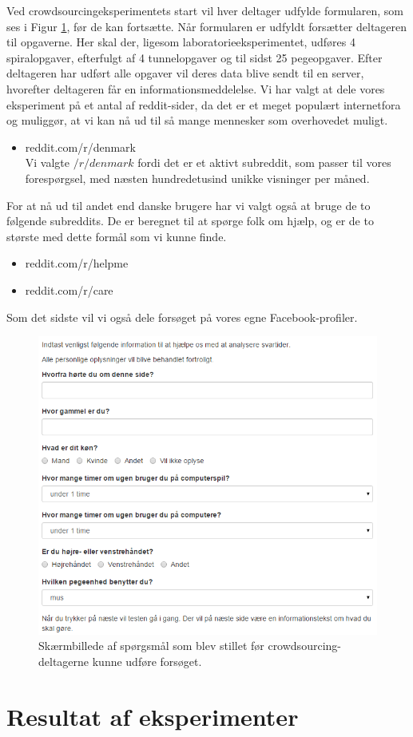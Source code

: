 Ved crowdsourcingeksperimentets start vil hver deltager udfylde formularen, som ses i Figur \ref{fig:Questions}, før de kan fortsætte. Når formularen er udfyldt forsætter deltageren til opgaverne. Her skal der, ligesom laboratorieeksperimentet, udføres 4 spiralopgaver, efterfulgt af 4 tunnelopgaver og til sidst 25 pegeopgaver. Efter deltageren har udført alle opgaver vil deres data blive sendt til en server, hvorefter deltageren får en informationsmeddelelse.
Vi har valgt at dele vores eksperiment på et antal af reddit-sider, da det er et meget populært internetfora og muliggør, at vi kan nå ud til så mange mennesker som overhovedet muligt.
\begin{itemize}
\item reddit.com/r/denmark\\
Vi valgte $/r/denmark$ fordi det er et aktivt subreddit, som passer til vores forespørgsel, med næsten hundredetusind unikke visninger per måned.
\end{itemize}
For at nå ud til andet end danske brugere har vi valgt også at bruge de to følgende subreddits. De er beregnet til at spørge folk om hjælp, og er de to største med dette formål som vi kunne finde.
\begin{itemize}
\item reddit.com/r/helpme
\item reddit.com/r/care
\end{itemize}

Som det sidste vil vi også dele forsøget på vores egne Facebook-profiler.
\begin{figure}[h]
\centering
\includegraphics[width=.5\linewidth, trim = 0cm 0cm 7cm 0cm, clip]{images/screenshots/ex_questions}
\caption{Skærmbillede af spørgsmål som blev stillet før crowdsourcing-deltagerne kunne udføre forsøget.}
\label{fig:Questions}
\end{figure}

\section*{Resultat af eksperimenter}

